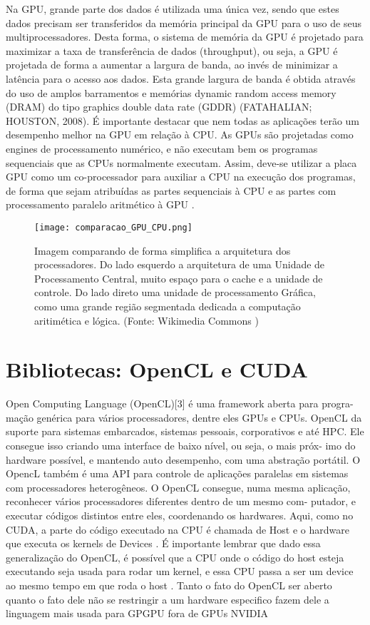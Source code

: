 Na GPU, grande parte dos dados é utilizada uma única vez, sendo que estes dados precisam ser transferidos da memória principal da GPU para o uso de seus multiprocessadores. Desta forma, o sistema de memória da GPU é projetado para maximizar a taxa de transferência de dados (throughput), ou seja, a GPU é projetada de forma a aumentar a largura de banda, ao invés de minimizar a latência para o acesso aos dados. Esta grande largura de banda é obtida através do uso de amplos barramentos e memórias dynamic random access memory (DRAM) do tipo graphics
double data rate (GDDR) (FATAHALIAN; HOUSTON, 2008). É importante destacar que nem todas as aplicações terão um desempenho melhor na GPU em relação à CPU. As GPUs são projetadas como engines de processamento numérico, e não executam bem os programas sequenciais que as CPUs normalmente executam. Assim, deve-se utilizar a placa GPU como um co-processador para auxiliar a CPU na execução dos programas, de forma que sejam atribuídas as partes sequenciais à CPU e as partes com processamento paralelo aritmético à GPU \citep{massively:16}.

  \begin{figure}[!h]
    \centering
    \texttt{[image: comparacao\_GPU\_CPU.png]}
    \caption{Imagem comparando de forma simplifica a arquitetura dos processadores. Do lado esquerdo a arquitetura de uma Unidade de Processamento Central, muito espaço para o cache e a unidade de controle. Do lado direto uma unidade de processamento Gráfica, como uma grande região segmentada dedicada a computação aritimética e lógica. (Fonte: Wikimedia Commons \protect\footnotemark)}
    \label{fig:cpuvsgpu}
  \end{figure}


\section{Bibliotecas: OpenCL e CUDA}
Open Computing Language (OpenCL)[3] é uma framework aberta para progra-
mação genérica para vários processadores, dentre eles GPUs e CPUs. OpenCL
da suporte para sistemas embarcados, sistemas pessoais, corporativos e até HPC.
Ele consegue isso criando uma interface de baixo nível, ou seja, o mais próx-
imo do hardware possível, e mantendo auto desempenho, com uma abstração
portátil. O OpencL também é uma API para controle de aplicações paralelas em
sistemas com processadores heterogêneos. O OpenCL consegue, numa mesma
aplicação, reconhecer vários processadores diferentes dentro de um mesmo com-
putador, e executar códigos distintos entre eles, coordenando os hardwares.
Aqui, como no CUDA, a parte do código executado na CPU é chamada de Host
e o hardware que executa os kernels de Devices . É importante lembrar que
dado essa generalização do OpenCL, é possível que a CPU onde o código do
host esteja executando seja usada para rodar um kernel, e essa CPU passa a ser
um device ao mesmo tempo em que roda o host . Tanto o fato do OpenCL ser
aberto quanto o fato dele não se restringir a um hardware especifico fazem dele
a linguagem mais usada para GPGPU fora de GPUs NVIDIA

